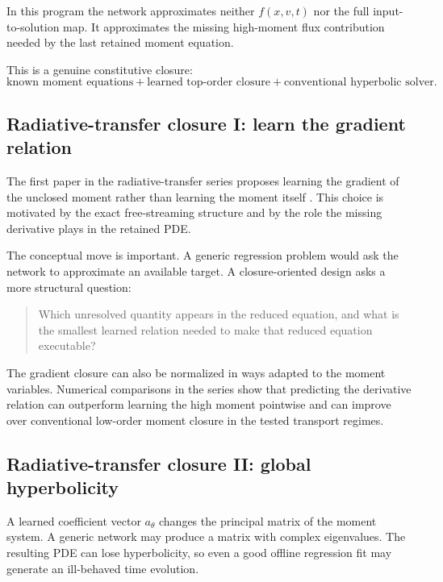 \documentclass[11pt]{article}
\begin{document}
\begin{bigidea}
In this program the network approximates neither \(f(x,v,t)\) nor the full input-to-solution map. It approximates the missing high-moment flux contribution needed by the last retained moment equation.
\end{bigidea}

This is a genuine constitutive closure:
\[
\boxed{
\text{known moment equations}
+
\text{learned top-order closure}
+
\text{conventional hyperbolic solver}.
}
\]

\subsection{Radiative-transfer closure I: learn the gradient relation}

The first paper in the radiative-transfer series proposes learning the gradient of the unclosed moment rather than learning the moment itself \citep{huang2021rte1}. This choice is motivated by the exact free-streaming structure and by the role the missing derivative plays in the retained PDE.

The conceptual move is important. A generic regression problem would ask the network to approximate an available target. A closure-oriented design asks a more structural question:
\begin{quote}
Which unresolved quantity appears in the reduced equation, and what is the smallest learned relation needed to make that reduced equation executable?
\end{quote}

The gradient closure can also be normalized in ways adapted to the moment variables. Numerical comparisons in the series show that predicting the derivative relation can outperform learning the high moment pointwise and can improve over conventional low-order moment closure in the tested transport regimes.

\subsection{Radiative-transfer closure II: global hyperbolicity}

A learned coefficient vector \(a_\theta\) changes the principal matrix of the moment system. A generic network may produce a matrix with complex eigenvalues. The resulting PDE can lose hyperbolicity, so even a good offline regression fit may generate an ill-behaved time evolution.
\end{document}

